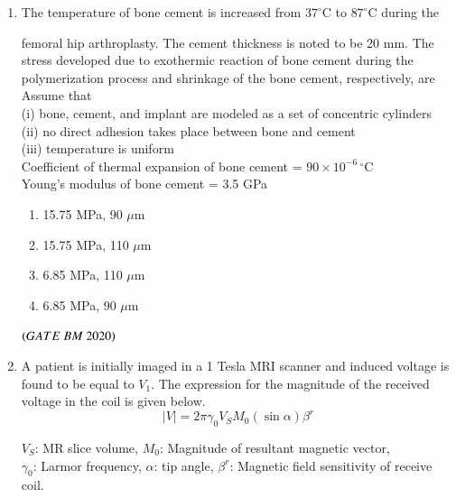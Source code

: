 \documentclass[journal,12pt,onecolumn]{IEEEtran}
\theoremstyle{remark}
\begin{document}
\begin{enumerate}
\item The temperature of bone cement is increased from $37^\circ\mathrm{C}$ to $87^\circ\mathrm{C}$ during the

femoral hip arthroplasty. The cement thickness is noted to be 20 mm. The stress
developed due to exothermic reaction of bone cement during the polymerization
process and shrinkage of the bone cement, respectively, are\\

Assume that\\

(i) bone, cement, and implant are modeled as a set of concentric cylinders\\

(ii) no direct adhesion takes place between bone and cement\\

(iii) temperature is uniform\\

Coefficient of thermal expansion of bone cement = $90 \times 10^{-6}\,^\circ\mathrm{C}$\\
Young's modulus of bone cement = 3.5 GPa

\begin{enumerate}[label=\alph*)] 
\item\hspace{0.5cm}15.75 MPa, 90 $\mu$m
\item\hspace{0.5cm}15.75 MPa, 110 $\mu$m
\item\hspace{0.5cm}6.85 MPa, 110 $\mu$m
\item\hspace{0.5cm}6.85 MPa, 90 $\mu$m
 \end{enumerate}
 \hfill $\left(GATE\ BM\ 2020\right)$
 
\item A patient is initially imaged in a 1 Tesla MRI scanner and induced voltage is found 
to be equal to $V_1$. The expression for the magnitude of the received voltage in the 
coil is given below.
\[
|V| = 2 \pi \gamma_0 V_S M_0 (\sin \alpha) \beta^r
\]
  
$V_S$: MR slice volume,
$M_0$: Magnitude of resultant magnetic vector,\\
$\gamma_0$: Larmor frequency,  
$\alpha$: tip angle,  
$\beta^r$: Magnetic field sensitivity of receive coil.  \\


\end{enumerate}
\end{document}
